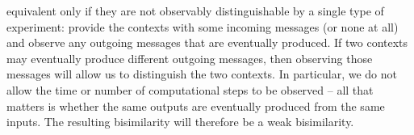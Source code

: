  equivalent only if they are not observably distinguishable by a single type of experiment: provide the contexts with some incoming messages (or none at all) and observe any outgoing messages that are eventually produced.%
If two contexts may eventually produce different outgoing messages, then observing those messages will allow us to distinguish the two contexts.
In particular, we do not allow the time or number of computational steps to be observed -- all that matters is whether the same outputs are eventually produced from the same inputs.
The resulting bisimilarity will therefore be a weak bisimilarity.


